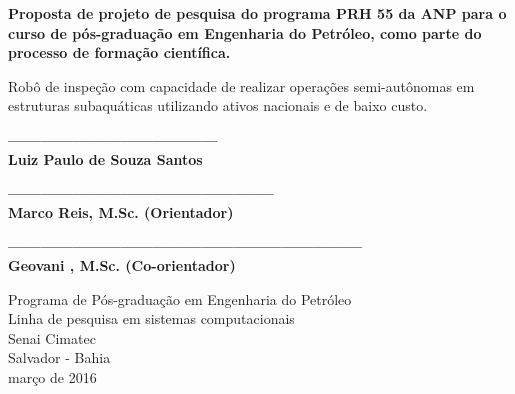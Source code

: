 \begin{center}
  \vspace*{0.8cm}
  {\Large \bf Proposta de projeto de pesquisa do programa PRH 55 da ANP para o curso de pós-graduação em Engenharia do Petróleo, como parte do processo de formação científica.}

  \vspace*{2.5cm}

  {\Large Robô de inspeção com capacidade de realizar operações semi-autônomas em estruturas subaquáticas utilizando ativos nacionais e de baixo custo.}
           \vspace*{2.5cm}
  
  {\bf ---------------------------------------\\
  Luiz Paulo de Souza Santos}
  
  \vspace*{1.5cm}
  {\bf --------------------------------------------------\\
  Marco Reis, M.Sc. (Orientador)}
  
   \vspace*{1.5cm}
  {\bf ------------------------------------------------------------------\\
  Geovani , M.Sc. (Co-orientador)}
  
   \begin{center}
   \end{center}
	\vspace*{0.3cm}

  {Programa de Pós-graduação em Engenharia do Petróleo\\
          [-3mm] Linha de pesquisa em sistemas computacionais\\
          [-3mm] Senai Cimatec\\
          [-3mm] Salvador - Bahia\\
          [-3mm] março de 2016}
\end{center}

\newpage
\thispagestyle{empty}
\begin{center}
 \vspace*{2cm}
\end{center}


